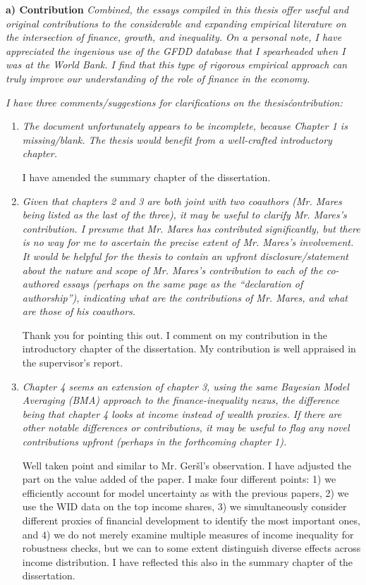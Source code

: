 \textbf{a) Contribution}
\textit{Combined, the essays compiled in this thesis offer useful and original contributions to the considerable and expanding empirical literature on the intersection of finance, growth, and inequality. On a personal note, I have appreciated the ingenious use of the GFDD database that I spearheaded when I was at the World Bank. I find that this type of rigorous empirical approach can truly improve our understanding of the role of finance in the economy.}

\textit{I have three comments/suggestions for clarifications on the thesis\' contribution:}

\begin{enumerate}
    \item \textit{The document unfortunately appears to be incomplete, because Chapter 1 is missing/blank. The thesis would benefit from a well-crafted introductory chapter.}
    
    I have amended the summary chapter of the dissertation.

    \item \textit{Given that chapters 2 and 3 are both joint with two coauthors (Mr. Mares being listed as the last of the three), it may be useful to clarify Mr. Mares's contribution. I presume that Mr. Mares has contributed significantly, but there is no way for me to ascertain the precise extent of Mr. Mares's involvement. It would be helpful for the thesis to contain an upfront disclosure/statement about the nature and scope of Mr. Mares's contribution to each of the co-authored essays (perhaps on the same page as the ``declaration of authorship''), indicating what are the contributions of Mr. Mares, and what are those of his coauthors.}
    
    Thank you for pointing this out. I comment on my contribution in the introductory chapter of the dissertation. My contribution is well appraised in the supervisor's report.

    \item \textit{Chapter 4 seems an extension of chapter 3, using the same Bayesian Model Averaging (BMA) approach to the finance-inequality nexus, the difference being that chapter 4 looks at income instead of wealth proxies. If there are other notable differences or contributions, it may be useful to flag any novel contributions upfront (perhaps in the forthcoming chapter 1).}
    
    Well taken point and similar to Mr. Ger\v{s}l's observation. I have adjusted the part on the value added of the paper. I make four different points: 1) we efficiently account for model uncertainty as with the previous papers, 2) we use the \ac{WID} data on the top income shares, 3) we simultaneously consider different proxies of financial development to identify the most important ones, and 4) we do not merely examine multiple measures of income inequality for robustness checks, but we can to some extent distinguish diverse effects across income distribution. I have reflected this also in the summary chapter of the dissertation.

\end{enumerate}

